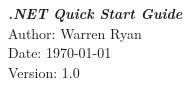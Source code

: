 \vspace*{\fill}
    \begin{center}
        {\fontsize{36pt}{20pt}\textbf{\itshape .NET Quick Start Guide}}\\[12cm]
        \LARGE{Author: Warren Ryan}\\[1cm]
        \LARGE{Date: \today}\\[1cm]
        \LARGE{Version: 1.0}
    \end{center}
\vspace*{\fill}
\pagestyle{empty} 